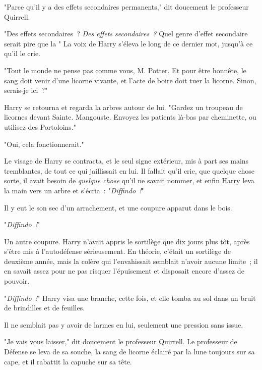 "Parce qu'il y a des effets secondaires permanents," dit doucement le professeur Quirrell.

"Des effets secondaires~? \emph{Des effets secondaires~?} Quel genre d'effet secondaire serait pire que la " La voix de Harry s'éleva le long de ce dernier mot, jusqu'à ce qu'il le crie.

"Tout le monde ne pense pas comme vous, M. Potter. Et pour être honnête, le sang doit venir d'une licorne vivante, et l'acte de boire doit tuer la licorne. Sinon, serais-je ici~?"

Harry se retourna et regarda la arbres autour de lui. "Gardez un troupeau de licornes devant Sainte. Mangouste. Envoyez les patients là-bas par cheminette, ou utilisez des Portoloins."

"Oui, cela fonctionnerait."

Le visage de Harry se contracta, et le seul signe extérieur, mis à part ses mains tremblantes, de tout ce qui jaillissait en lui. Il fallait qu'il crie, que quelque chose sorte, il avait besoin de \emph{quelque chose} qu'il ne savait nommer, et enfin Harry leva la main vers un arbre et s'écria~: "\emph{Diffindo~!}"

Il y eut le son sec d'un arrachement, et une coupure apparut dans le bois.

"\emph{Diffindo~!}"

Un autre coupure. Harry n'avait appris le sortilège que dix jours plus tôt, après s'être mis à l'autodéfense sérieusement. En théorie, c'était un sortilège de deuxième année, mais la colère qui l'envahissait semblait n'avoir aucune limite~; il en savait assez pour ne pas risquer l'épuisement et disposait encore d'assez de pouvoir.

"\emph{Diffindo~!}" Harry visa une branche, cette fois, et elle tomba au sol dans un bruit de brindilles et de feuilles.

Il ne semblait pas y avoir de larmes en lui, seulement une pression sans issue.

"Je vais vous laisser," dit doucement le professeur Quirrell. Le professeur de Défense se leva de sa souche, la sang de licorne éclairé par la lune toujours sur sa cape, et il rabattit la capuche sur sa tête. 

